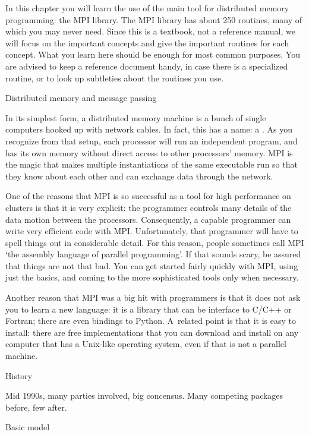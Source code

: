 
In this chapter you will learn the use of the main tool for 
distributed memory programming: the \acf{MPI} library.
The \ac{MPI} library has about 250 routines, many of which you may
never need. Since this is a textbook, not a reference manual, we will
focus on the important concepts and give the important routines for
each concept. What you learn here should be enough for most common
purposes. You are advised to keep a reference document handy, in
case there is a specialized routine, or to look up subtleties about
the routines you use.

 {Distributed memory and message passing}

In its simplest form, a distributed memory machine is a bunch of 
single computers hooked up with network cables. In fact, this has a name:
a . As you recognize from that setup, 
each processor will run an independent program, and has its own memory
without direct access to other processors' memory. MPI is the magic
that makes multiple instantiations of the same executable run
so that they know about each other and can exchange data through the 
network.

One of the reasons that MPI is so successful as a tool for high
performance on clusters is that it is very explicit: the programmer
controls many details of the data motion between the processors.
Consequently, a capable programmer can write very efficient code with MPI.
Unfortunately, that programmer will have to spell things out
in considerable detail. For this reason, people sometimes call MPI
`the assembly language of parallel programming'. If that sounds scary,
be assured that things are not that bad. You can get started 
fairly quickly with MPI, using just the basics,
and coming to the more sophisticated tools 
only when necessary.

Another reason that MPI was a big hit with programmers is that
it does not ask you to learn a new language: it is a library that 
can be interface to C/C++ or Fortran; there are even bindings to Python.
A~related point is that it is easy to install: there are free implementations
that you can download and install on any computer that has a Unix-like
operating system, even if that is not a parallel machine.

 {History}

Mid 1990s, many parties involved, big concensus. Many competing packages
before, few after.

 {Basic model}

